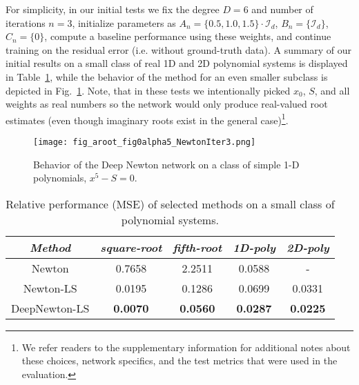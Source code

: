 \documentclass{article}
\begin{document}
For simplicity, in our initial tests we fix the degree $D=6$ and number of iterations $n=3$, initialize parameters as \mbox{$A_n=\{ 0.5, 1.0, 1.5 \}\cdot \mathcal{I}_d$}, $B_n=\{\mathcal{I}_d\}$, $C_n=\{0\}$, compute a baseline performance using these weights, and continue training on the residual error (i.e. without ground-truth data). A summary of our initial results on a small class of real 1D and 2D polynomial systems is displayed in Table~\ref{tab:newton}, while the behavior of the method for an even smaller subclass is depicted in Fig.~\ref{fig:newton_aroot}. Note, that in these tests we intentionally picked $x_0$, $S$, and all weights as real numbers so the network would only produce real-valued root estimates (even though imaginary roots exist in the general case)\footnote{We refer readers to the supplementary information for additional notes about these choices, network specifics, and the test metrics that were used in the evaluation.}.
\begin{figure}[hbt!]
    \centering
    \texttt{[image: fig\_aroot\_fig0alpha5\_NewtonIter3.png]}
    \caption{Behavior of the Deep Newton network on a class of simple 1-D polynomials, $x^5 - S = 0$.} %
    \label{fig:newton_aroot}
\end{figure}

\begin{table}[h!]
    \vspace{-2mm}
    \centering
    \small
    \begin{tabular}{c | c | c | c | c}
      \textit{Method} & \textit{square-root} & \textit{fifth-root} & \textit{1D-poly} & \textit{2D-poly} \\
      \hline
      Newton & 0.7658 & 2.2511 & 0.0588 & - \\
      Newton-LS & 0.0195 & 0.1286 & 0.0699 & 0.0331 \\
      DeepNewton-LS & \textbf{0.0070} & \textbf{0.0560} & \textbf{0.0287} & \textbf{0.0225}\\
    \end{tabular}
    \vspace{2mm}
    \caption{Relative performance (MSE) of selected methods on a small class of polynomial systems.} \label{tab:newton}
  \vspace{-4mm}
\end{table}
\end{document}
